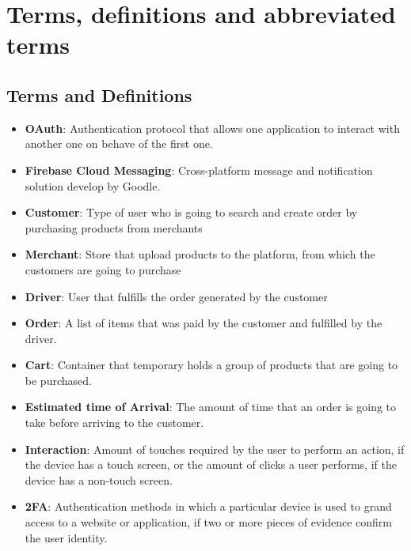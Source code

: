 \section{Terms, definitions and abbreviated terms}
\subsection{Terms and Definitions}
\begin{itemize}
    \item \textbf{OAuth}: Authentication protocol that allows one application 
    to interact with another one on behave of the first one.
    \item \textbf{Firebase Cloud Messaging}: Cross-platform message and 
    notification solution develop by Goodle.
    \item \textbf{Customer}: Type of user who is going to search and create 
    order by purchasing products from merchants
    \item \textbf{Merchant}: Store that upload products to the platform, from
    which the customers are going to purchase 
    \item \textbf{Driver}: User that fulfills the order generated by the 
    customer 
    \item \textbf{Order}: A list of items that was paid by the customer and 
    fulfilled by the driver.
    \item \textbf{Cart}: Container that temporary holds a group of products 
    that are going to be purchased.
    \item \textbf{Estimated time of Arrival}: The amount of time that 
    an order is going to take before arriving to the customer.
    \item \textbf{Interaction}: Amount of touches required by the user to 
    perform an action, if the device has a touch screen, or the amount of 
    clicks a user performs, if the device has a non-touch screen.
    \item \textbf{2FA}: Authentication methods in which a particular device is 
    used to grand access to a website or application, if two or more pieces of 
    evidence confirm the user identity.
\end{itemize}
\pagebreak
